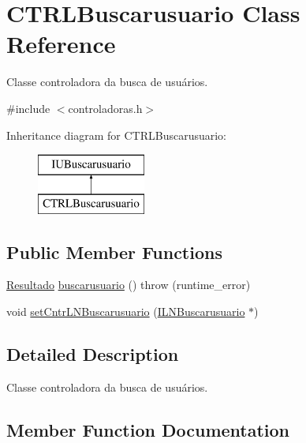 \hypertarget{classCTRLBuscarusuario}{}\section{C\+T\+R\+L\+Buscarusuario Class Reference}
\label{classCTRLBuscarusuario}


Classe controladora da busca de usuários.  




{\ttfamily \#include $<$controladoras.\+h$>$}

Inheritance diagram for C\+T\+R\+L\+Buscarusuario\+:\begin{figure}[H]
\begin{center}
\leavevmode
\includegraphics[height=2.000000cm]{classCTRLBuscarusuario}
\end{center}
\end{figure}
\subsection*{Public Member Functions}
\begin{DoxyCompactItemize}
\item 
\hyperlink{classResultado}{Resultado} \hyperlink{classCTRLBuscarusuario_a4c73f22cb6b0083a99a21e3abe45cc5a}{buscarusuario} ()  throw (runtime\+\_\+error)
\item 
void \hyperlink{classCTRLBuscarusuario_afb7a2a586b958579f7a777b3d93da661}{set\+Cntr\+L\+N\+Buscarusuario} (\hyperlink{classILNBuscarusuario}{I\+L\+N\+Buscarusuario} $\ast$)
\end{DoxyCompactItemize}


\subsection{Detailed Description}
Classe controladora da busca de usuários. 

\subsection{Member Function Documentation}
\mbox{\label{classCTRLBuscarusuario_a4c73f22cb6b0083a99a21e3abe45cc5a}} 
